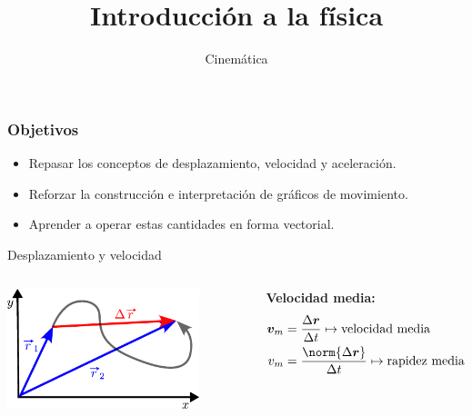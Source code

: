 \documentclass[9pt, aspectratio=169]{beamer}
\title{Introducción a la física}
\subtitle{Cinemática}
\begin{document}
\maketitle
\begin{frame}
  \frametitle{Objetivos}
\Large

\begin{itemize}
 \item Repasar los conceptos de desplazamiento, velocidad y aceleración.
 \item Reforzar la construcción e interpretación de gráficos de movimiento.
 \item Aprender a operar estas cantidades en forma vectorial.
\end{itemize}
\end{frame}

\begin{frame}{Desplazamiento y velocidad}
\begin{columns}
\cx
\begin{center}
    \includegraphics[width=0.8\textwidth]{figs/fig-01.pdf}
\end{center}
\cx
\textbf{Velocidad media:}
\begin{align*}
    \bm{v}_m &= \frac{\Delta \bm{r}}{\Delta t} \mapsto \text {velocidad media}\\
    v_m &= \frac{\norm{\Delta \bm{r}}}{\Delta t} \mapsto \text {rapidez media}
\end{align*}
\end{columns}
\pause


\end{frame}
\end{document}
